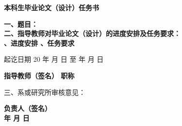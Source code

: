 \cleardoublepage{}

\begin{center}
  {\bfseries\hwxk{} 本科生毕业论文（设计）任务书}
\end{center}

{
    \bfseries
    \noindent 一、题目：\\
    \noindent 二、指导教师对毕业论文（设计）的进度安排及任务要求：\\
    、进度安排
    \vskip 60mm
    、任务要求
    \vskip 40mm

    \noindent 起讫日期 20 \quad 年 \quad  月 \quad  日 \quad 至  \quad  年 \quad  月  \quad 日
    \begin{flushright}
        \bfseries {}
            指导教师（签名） \uwave{\quad\quad\quad\quad\quad}
            职称 \uwave{\quad\quad\quad\quad\quad}
    \end{flushright}

    \noindent 三、系或研究所审核意见：\\

    \mbox{} \vfill
    \begin{flushright}
      \bfseries {}
      负责人（签名） \uwave{\quad\quad\quad\quad\quad} \\
      \quad 年 \quad 月 \quad 日
    \end{flushright}
}
